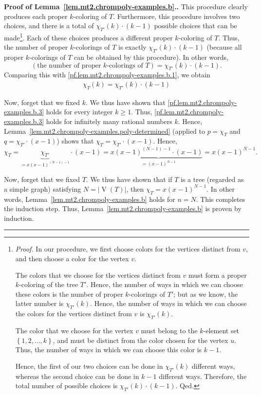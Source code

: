 \documentclass[numbers=enddot,12pt,final,onecolumn,notitlepage]{scrartcl}%
\theoremstyle{definition}
\newenvironment{proof}[1][Proof]{\noindent\textbf{#1.} }{\ \rule{0.5em}{0.5em}}
\newcommand{\set}[1]{\left\{ #1 \right\}}
\newcommand{\abs}[1]{\left| #1 \right|}
\newcommand{\tup}[1]{\left( #1 \right)}
\newcommand{\verts}[1]{\operatorname{V}\left( #1 \right)}
\begin{document}
\begin{proof}[Proof of Lemma~\ref{lem.mt2.chrompoly-examples.b}.]
This procedure clearly produces each proper $k$-coloring
of $T$.
Furthermore, this procedure involves two choices, and there
is a total of
$\chi_{T'} \tup{k} \cdot \tup{k-1}$
possible choices that can be made\footnote{\textit{Proof.}
  In our procedure, we first choose colors for the
  vertices distinct from $v$, and then choose a color for
  the vertex $v$.
  \par
  The colors that we choose for the vertices distinct from
  $v$ must form a proper $k$-coloring of the tree $T'$.
  Hence, the number of ways in which we can choose these
  colors is the number of proper $k$-colorings of $T'$;
  but as we know, the latter number is $\chi_{T'} \tup{k}$.
  Hence, the number of ways in which we can choose the
  colors for the vertices distinct from $v$ is
  $\chi_{T'} \tup{k}$. \par
  The color that we choose for the vertex $v$ must belong
  to the $k$-element set $\set{1, 2, \ldots, k}$, and must be
  distinct from the color chosen for the vertex $u$.
  Thus, the number of ways in which we can choose this color
  is $k-1$. \par
  Hence, the first of our two choices can be done in
  $\chi_{T'} \tup{k}$ different ways, whereas the second choice
  can be done in $k-1$ different ways.
  Therefore, the total number of possible choices is
  $\chi_{T'} \tup{k} \cdot \tup{k-1}$.
  Qed.}.
Each of these choices produces a different proper $k$-coloring
of $T$.
Thus, the number of proper $k$-colorings of $T$ is
exactly $\chi_{T'} \tup{k} \cdot \tup{k-1}$
(because all proper $k$-colorings of $T$ can be
obtained by this procedure).
In other words,
\[
\tup{\text{the number of proper } k \text{-colorings of } T}
= \chi_{T'} \tup{k} \cdot \tup{k-1} .
\]
Comparing this with
\eqref{pf.lem.mt2.chrompoly-examples.b.1}, we obtain
\begin{align}
\chi_T \tup{k}
= \chi_{T'} \tup{k} \cdot \tup{k-1}
\label{pf.lem.mt2.chrompoly-examples.b.3}
\end{align}

Now, forget that we fixed $k$.
We thus have shown that
\eqref{pf.lem.mt2.chrompoly-examples.b.3}
holds for every integer $k \geq 1$.
Thus, \eqref{pf.lem.mt2.chrompoly-examples.b.3}
holds for infinitely many rational numbers $k$.
Hence, Lemma~\ref{lem.mt2.chrompoly-examples.poly-determined}
(applied to $p = \chi_{T}$ and
$q = \chi_{T'} \cdot \tup{x-1}$)
shows that
$\chi_{T} = \chi_{T'} \cdot \tup{x-1}$.
Hence,
\[
\chi_{T}
= \underbrace{\chi_{T'}}_{= x \tup{x-1}^{\tup{N-1}-1}} \cdot \tup{x-1}
= x \underbrace{\tup{x-1}^{\tup{N-1}-1} \cdot \tup{x-1}}_{= \tup{x-1}^{N-1}}
= x \tup{x-1}^{N-1} .
\]

Now, forget that we fixed $T$.
We thus have shown that if $T$ is a tree (regarded as a simple
graph) satisfying $N = \abs{\verts{T}}$,
then $\chi_T = x \tup{x-1}^{N-1}$.
In other words, Lemma~\ref{lem.mt2.chrompoly-examples.b}
holds for $n = N$.
This completes the induction step.
Thus,
Lemma~\ref{lem.mt2.chrompoly-examples.b} is proven
by induction.
\end{proof}
\end{document}
